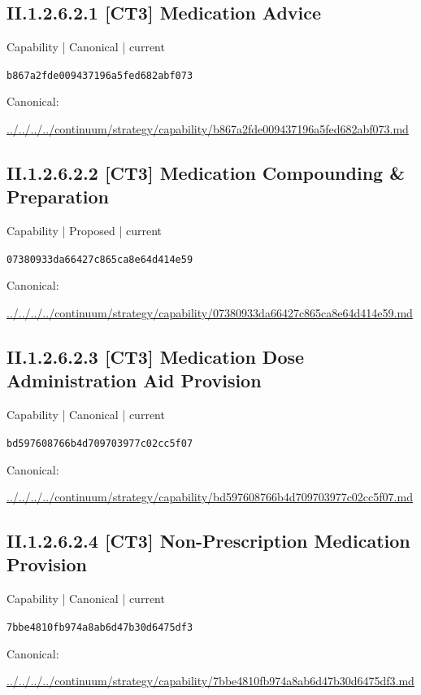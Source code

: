 \documentclass[10pt,a4paper]{article}
\begin{document}
\subsection*{II.1.2.6.2.1 [CT3] Medication Advice}
\label{element-b867a2fde009437196a5fed682abf073}
{\small Capability | Canonical | current}\par
\texttt{b867a2fde009437196a5fed682abf073}\par
Canonical: \par
{\footnotesize\url{../../../../continuum/strategy/capability/b867a2fde009437196a5fed682abf073.md}}\par
\subsection*{II.1.2.6.2.2 [CT3] Medication Compounding \& Preparation}
\label{element-07380933da66427c865ca8e64d414e59}
{\small Capability | Proposed | current}\par
\texttt{07380933da66427c865ca8e64d414e59}\par
Canonical: \par
{\footnotesize\url{../../../../continuum/strategy/capability/07380933da66427c865ca8e64d414e59.md}}\par
\subsection*{II.1.2.6.2.3 [CT3] Medication Dose Administration Aid Provision}
\label{element-bd597608766b4d709703977c02cc5f07}
{\small Capability | Canonical | current}\par
\texttt{bd597608766b4d709703977c02cc5f07}\par
Canonical: \par
{\footnotesize\url{../../../../continuum/strategy/capability/bd597608766b4d709703977c02cc5f07.md}}\par
\subsection*{II.1.2.6.2.4 [CT3] Non-Prescription Medication Provision}
\label{element-7bbe4810fb974a8ab6d47b30d6475df3}
{\small Capability | Canonical | current}\par
\texttt{7bbe4810fb974a8ab6d47b30d6475df3}\par
Canonical: \par
{\footnotesize\url{../../../../continuum/strategy/capability/7bbe4810fb974a8ab6d47b30d6475df3.md}}\par
\end{document}
